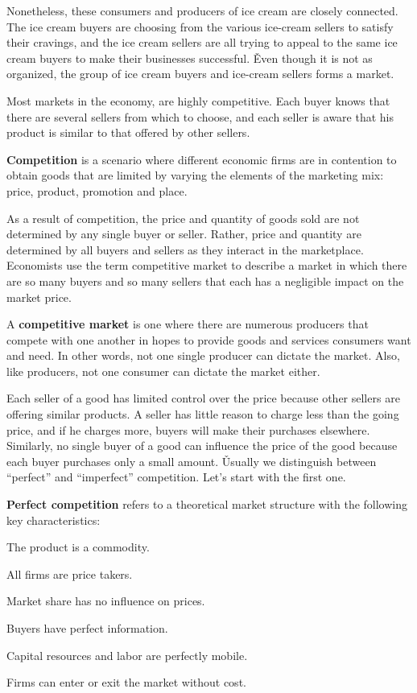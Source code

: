 Nonetheless, these consumers and producers of ice cream are closely connected. The ice cream buyers are choosing from
the various ice-cream sellers to satisfy their cravings, and the ice cream sellers are all trying to appeal to the
same ice cream buyers to make their businesses successful. \v

Even though it is not as organized, the group of ice cream buyers and ice-cream sellers forms a market.
\ee

Most markets in the economy, are highly competitive. Each buyer knows that there are several sellers from which to
choose, and each seller is aware that his product is similar to that offered by other sellers.

\bd[Competition]
\textbf{Competition} is a scenario where different economic firms are in contention to obtain goods that are limited
by varying the elements of the marketing mix: price, product, promotion and place.
\ed

As a result of competition, the price and quantity of goods sold are not determined by any single buyer or seller.
Rather, price and quantity are determined by all buyers and sellers as they interact in the marketplace. Economists
use the term competitive market to describe a market in which there are so many buyers and so many sellers that each
has a negligible impact on the market price.

A \textbf{competitive market} is one where there are numerous producers that compete with one another in hopes to
provide goods and services consumers want and need. In other words, not one single producer can dictate the market.
Also, like producers, not one consumer can dictate the market either.
\ed

Each seller of a good has limited control over the price because other sellers are offering similar products. A
seller has little reason to charge less than the going price, and if he charges more, buyers will make their
purchases elsewhere. Similarly, no single buyer of a good can influence the price of the good because each buyer
purchases only a small amount. \v

Usually we distinguish between ``perfect'' and ``imperfect'' competition. Let's start with the first one.

\textbf{Perfect competition} refers to a theoretical market structure with the following key characteristics:
\bit
\item The product is a commodity.
\item All firms are price takers.
\item Market share has no influence on prices.
\item Buyers have perfect information.
\item Capital resources and labor are perfectly mobile.
\item Firms can enter or exit the market without cost.
\eit
\ed

